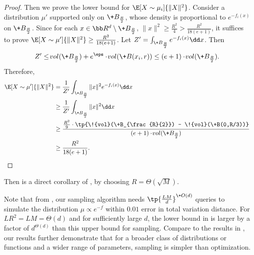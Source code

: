 \begin{proof}
    Then we prove the lower bound for $\E[X\sim \mu_i]{\|X\|^2}$. Consider a distribution $\mu'$ supported only on $\+B_{\frac{R}{2}}$, whose density is proportional to $e^{-f_i(x)}$ on $\+B_{\frac{R}{2}}$.
    Since for each $x\in \bb R^d \setminus \+B_{\frac{R}{2}}$, $\|x\|^2 \geq \frac{R^2}{4} > \frac{R^2}{18(e+1)}$, it suffices to prove $\E[X\sim \mu']{\|X\|^2}\geq \frac{R^2}{18(e+1)}$. Let $Z' = \int_{\+B_{\frac{R}{2}}} e^{-f_i(x)}\dd x$. Then
    \[
        Z' \leq \!{vol}(\+B_{\frac{R}{2}}) + e^{\eps}\cdot \!{vol}(\+B(x_i,r)) \leq (e+1)\cdot \!{vol}(\+B_{\frac{R}{2}}).
    \]
    Therefore,
    \begin{align*}
        \E[X\sim \mu']{\|X\|^2} & = \frac{1}{Z'} \int_{\+B_{\frac{R}{2}}} \|x\|^2 e^{-f_i(x)}\dd x \\
        &\geq \frac{1}{Z'} \int_{\+B_{\frac{R}{2}}} \|x\|^2 \dd x \\
        &\geq \frac{\frac{R^2}{9}\cdot \tp{\!{vol}(\+B_{\frac{R}{2}}) - \!{vol}(\+B(0,R/3))}}{(e+1)\cdot \!{vol}(\+B_{\frac{R}{2}})} \\
        &\geq \frac{R^2}{18(e+1)}.
    \end{align*}
\end{proof}

Then  is a direct corollary of ,  by choosing $R=\Theta(\sqrt{M})$. 

Note that from , our sampling algorithm needs $\tp{\frac{LM}{d}}^{\+O(d)}$ queries to simulate the distribution $\mu \propto e^{-f}$ within $0.01$ error in total variation  distance. For $LR^2=LM=\Theta(d)$ and for sufficiently large $d$, the lower bound in  is larger by a factor of $d^{\Theta(d)}$ than this upper bound for sampling. 
Compare to the results in \cite{MCJ+19}, our results further demonstrate that for a broader class of distributions or functions and a wider range of parameters, sampling is simpler than optimization.




